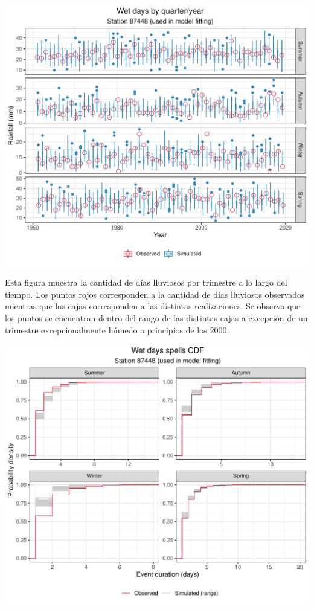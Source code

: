 \documentclass[
]{article}
\begin{document}
\begin{center}\includegraphics{Webinario_Generador_files/figure-latex/unnamed-chunk-28-1} \end{center}

Esta figura muestra la cantidad de días lluviosos por trimestre a lo largo del tiempo. Los puntos rojos corresponden a la cantidad de días lluviosos observados mientras que las cajas corresponden a las distintas realizaciones. Se observa que los puntos se encuentran dentro del rango de las distintas cajas a excepción de un trimestre excepcionalmente húmedo a principios de los 2000.

\begin{center}\includegraphics{Webinario_Generador_files/figure-latex/unnamed-chunk-29-1} \end{center}
\end{document}

